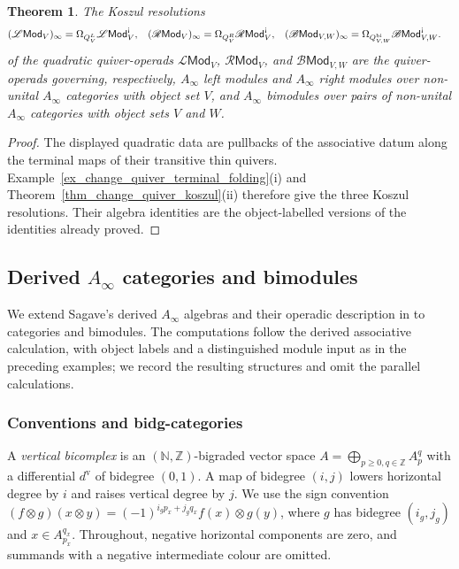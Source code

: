 \documentclass[11pt,letterpaper]{article}
\numberwithin{equation}{section}
\theoremstyle{plain}
\newtheorem{thm}{Theorem}[section]
\theoremstyle{definition}
\theoremstyle{remark}
\newcommand{\antishriek}{%
	\mathord{\mathchoice
		{\rotatebox[origin=c]{180}{$\displaystyle !$}}
		{\rotatebox[origin=c]{180}{$\textstyle !$}}
		{\rotatebox[origin=c]{180}{$\scriptstyle !$}}
		{\rotatebox[origin=c]{180}{$\scriptscriptstyle !$}}}}
\begin{document}
	\begin{thm}
		\label{thm_Koszulness_dg_category_modules}
		The Koszul resolutions 	\begin{align*}
			(\mathscr L\mathsf{Mod}_V)_\infty
			&=
			\Omega_{Q^L_V}\mathscr L\mathsf{Mod}_V^{\antishriek},
			&
			(\mathscr R\mathsf{Mod}_V)_\infty
			&=
			\Omega_{Q^R_V}\mathscr R\mathsf{Mod}_V^{\antishriek},
			&
			(\mathscr B\mathsf{Mod}_{V,W})_\infty
			&=
			\Omega_{Q^{\mathrm{bi}}_{V,W}}
			\mathscr B\mathsf{Mod}_{V,W}^{\antishriek}.
		\end{align*}
		of the quadratic quiver-operads
		$\mathscr L\mathsf{Mod}_V$,
		$\mathscr R\mathsf{Mod}_V$, and
		$\mathscr B\mathsf{Mod}_{V,W}$ are the quiver-operads governing, respectively,
		$A_\infty$ left modules and $A_\infty$ right modules over non-unital
		$A_\infty$ categories with object set $V$, and
		$A_\infty$ bimodules over pairs of non-unital $A_\infty$ categories with
		object sets $V$ and $W$.
	\end{thm}
\begin{proof}
The displayed quadratic data are pullbacks of the associative datum
along the terminal maps of their transitive thin quivers.
Example~\ref{ex_change_quiver_terminal_folding}(i) and
Theorem~\ref{thm_change_quiver_koszul}(ii) therefore give the three
Koszul resolutions.
Their algebra identities are the object-labelled versions of the
identities already proved.
\end{proof}

\subsection{Derived \texorpdfstring{$A_\infty$}{A-infinity} categories and bimodules}
\label{s_derived_Ainfinity_categories}

We extend Sagave's derived $A_\infty$ algebras \cite{sagave2007dg}
and their operadic description in
\cite{Livernet_Roitzheim_Whitehouse_derived_Ainfinity} to categories and
bimodules. The computations follow the derived associative calculation,
with object labels and a distinguished module input as in the preceding
examples; we record the resulting structures and omit the parallel
calculations.

\subsubsection{Conventions and bidg-categories}
\label{sss_bidg_categories}
A \textit{vertical bicomplex} is an $(\mathbb N,\mathbb Z)$-bigraded
vector space $A=\bigoplus_{p\geq0,q\in\mathbb Z}A_p^q$ with a differential
$d^{\mathrm v}$ of bidegree $(0,1)$. A map of bidegree $(i,j)$ lowers
horizontal degree by $i$ and raises vertical degree by $j$. We use the
sign convention
$(f\otimes g)(x\otimes y)=(-1)^{i_gp_x+j_gq_x}f(x)\otimes g(y)$,
where $g$ has bidegree $(i_g,j_g)$ and $x\in A_{p_x}^{q_x}$.
Throughout, negative horizontal components are zero, and summands with
a negative intermediate colour are omitted.
\end{document}
